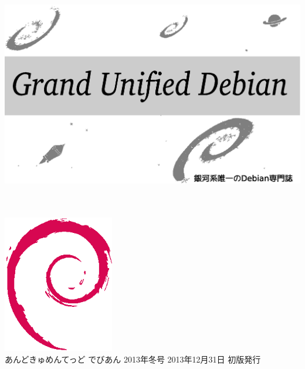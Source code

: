 \documentclass[mingoth,a4paper]{jsarticle}
\begin{document}
\begin{titlepage}
\thispagestyle{empty}

\hspace*{-2.5cm}
\includegraphics{image2012-natsu/gudeb.eps}\\
\\
\\

\hspace*{11cm}\includegraphics[height=6cm]{image200502/openlogo-nd.eps}\\
\vspace*{0.1cm}
\hfill あんどきゅめんてっど でびあん 2013年冬号 2013年12月31日 初版発行
\end{titlepage}

\newpage
\thispagestyle{empty}\mbox{}
\newpage
\end{document}
